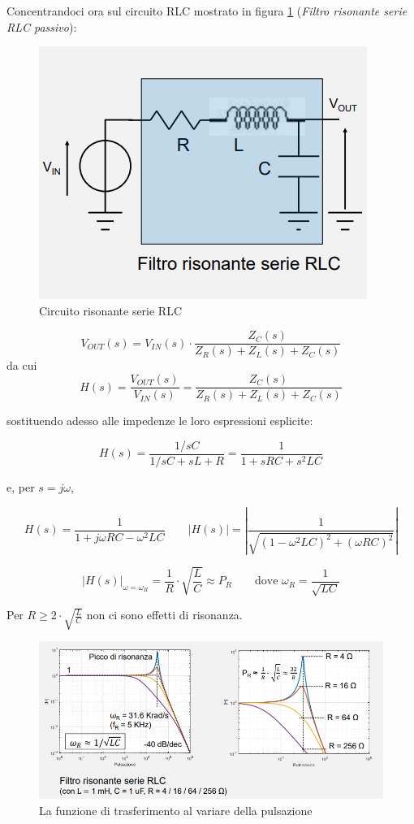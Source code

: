 \documentclass{article}
\begin{document}
\clearpage
Concentrandoci ora sul circuito RLC mostrato in figura \ref{Schema_circuito_risonante_serie_RLC} (\textit{Filtro risonante serie RLC passivo}):

\begin{figure}[h]
  \centering
  \includegraphics[scale=0.48]{IM_circuito_risonante_serie_RLC}
  \caption{Circuito risonante serie RLC}
  \label{Schema_circuito_risonante_serie_RLC}
\end{figure}
\[V_{OUT}(s) = V_{IN}(s) \cdot \frac{Z_C(s)}{Z_R(s) + Z_L(s) + Z_C(s)}\]
da cui
\[H(s) = \frac{V_{OUT} (s)}{V_{IN} (s)} = \frac{Z_C(s)}{Z_R(s) + Z_L(s) + Z_C(s)}\]

sostituendo adesso alle impedenze le loro espressioni esplicite:

\[H(s) = \frac{1/sC}{1/sC + sL + R} = \frac{1}{1 + sRC + s^2 LC}\]

e, per $s = j\omega$, 

\[H(s) = \frac{1}{1 + j \omega RC - \omega ^2 LC} \quad \quad |H(s)| = \left| \frac{1}{\sqrt{(1 - \omega ^2 LC)^2 + (\omega RC)^2}} \right| \]

\[|H(s)|_{\omega = \omega_R} = \frac{1}{R} \cdot \sqrt{\frac{L}{C}} \approx P_R \quad \quad \textrm{dove } \omega _R = \frac{1}{\sqrt{LC}}\]

Per $R \geq 2 \cdot \sqrt{\frac{L}{C}}$ non ci sono effetti di risonanza.

\begin{figure}[h]
  \centering
  \includegraphics[scale=0.48]{IM_circuito_risonante_serie_RLC_grafici}
  \caption{La funzione di trasferimento al variare della pulsazione}
  \label{Schema_circuito_risonante_serie_RLC_grafici}
\end{figure}
\end{document}
